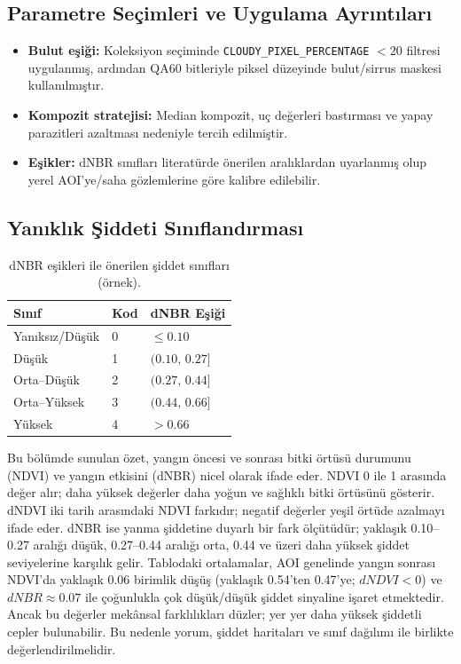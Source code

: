 \documentclass[11pt,a4paper]{article}
\begin{document}
\subsection*{Parametre Seçimleri ve Uygulama Ayrıntıları}
\begin{itemize}
  \item \textbf{Bulut eşiği:} Koleksiyon seçiminde \texttt{CLOUDY\_PIXEL\_PERCENTAGE} $<20$
  filtresi uygulanmış, ardından QA60 bitleriyle piksel düzeyinde bulut/sirrus maskesi
  kullanılmıştır.
  \item \textbf{Kompozit stratejisi:} Median kompozit, uç değerleri bastırması ve
  yapay parazitleri azaltması nedeniyle tercih edilmiştir.
  \item \textbf{Eşikler:} dNBR sınıfları literatürde önerilen aralıklardan uyarlanmış
  olup yerel AOI’ye/saha gözlemlerine göre kalibre edilebilir.
\end{itemize}

\subsection*{Yanıklık Şiddeti Sınıflandırması}
\begin{table}[h]
  \centering
  \begin{tabular}{@{}lll@{}}\toprule
  Sınıf & Kod & dNBR Eşiği \\\midrule
  Yanıksız/Düşük & 0 & $\leq 0.10$ \\
  Düşük & 1 & $(0.10,\,0.27]$ \\
  Orta--Düşük & 2 & $(0.27,\,0.44]$ \\
  Orta--Yüksek & 3 & $(0.44,\,0.66]$ \\
  Yüksek & 4 & $> 0.66$ \\\bottomrule
  \end{tabular}
  \caption{dNBR eşikleri ile önerilen şiddet sınıfları (örnek).}
\end{table}

Bu bölümde sunulan özet, yangın öncesi ve sonrası bitki örtüsü durumunu (NDVI) ve yangın etkisini (dNBR) nicel olarak ifade eder. NDVI 0 ile 1 arasında değer alır; daha yüksek değerler daha yoğun ve sağlıklı bitki örtüsünü gösterir. dNDVI iki tarih arasındaki NDVI farkıdır; negatif değerler yeşil örtüde azalmayı ifade eder. dNBR ise yanma şiddetine duyarlı bir fark ölçütüdür; yaklaşık 0.10--0.27 aralığı düşük, 0.27--0.44 aralığı orta, 0.44 ve üzeri daha yüksek şiddet seviyelerine karşılık gelir. Tablodaki ortalamalar, AOI genelinde yangın sonrası NDVI’da yaklaşık 0.06 birimlik düşüş (yaklaşık 0.54'ten 0.47'ye; \(dNDVI<0\)) ve \(dNBR \approx 0.07\) ile çoğunlukla çok düşük/düşük şiddet sinyaline işaret etmektedir. Ancak bu değerler mekânsal farklılıkları düzler; yer yer daha yüksek şiddetli cepler bulunabilir. Bu nedenle yorum, şiddet haritaları ve sınıf dağılımı ile birlikte değerlendirilmelidir.
\end{document}
